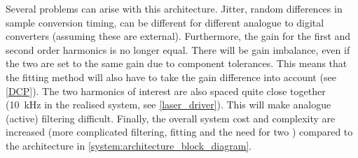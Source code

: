 \documentclass[\home/main.tex]{subfiles}
\begin{document}
    Several problems can arise with this architecture. Jitter, random differences in sample conversion timing, can be different for different analogue to digital converters (assuming these are external). Furthermore, the gain for the first and second order harmonics is no longer equal. There will be gain imbalance, even if the two  are set to the same gain due to component tolerances. This means that the fitting method will also have to take the gain difference into account (see \cref{DCP}). The two harmonics of interest are also spaced quite close together (\SI{10}{\kilo\hertz} in the realised system, see \cref{laser_driver}). This will make analogue (active) filtering difficult. Finally, the overall system cost and complexity are increased (more complicated filtering, fitting and the need for two ) compared to the architecture in \cref{system:architecture_block_diagram}.
  
\end{document}
